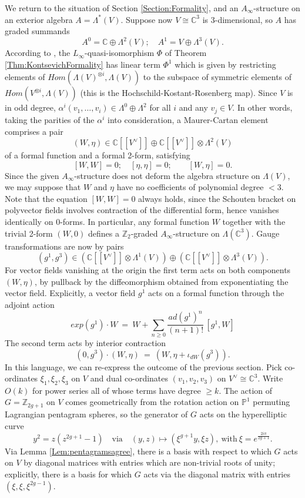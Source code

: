 \documentclass[reqno,10pt]{amsart}
\numberwithin{equation}{section}
\newcommand{\bC}{{\mathbb C}}
\newcommand{\bP}{{\mathbb P}}
\newcommand{\bZ}{{\mathbb Z}}
\theoremstyle{remark}
\begin{document}
We return to the situation of Section \ref{Section:Formality}, and an $A_{\infty}$-structure on an exterior algebra $A=\Lambda^*(V)$.  Suppose now $V \cong \bC^3$ is 3-dimensional, so $A$ has graded summands
\[
A^0 = \bC \oplus \Lambda^2(V); \quad A^1 = V \oplus \Lambda^3(V).
\]  
According to \cite[Theorem 3.3]{Seidel:HMSgenus2}, the $L_{\infty}$-quasi-isomorphism $\Phi$ of Theorem \ref{Thm:KontsevichFormality} has linear term $\Phi^1$ which is given by restricting elements of $Hom(\Lambda(V)^{\otimes i}, \Lambda(V))$ to the subspace of symmetric elements of $Hom(V^{\otimes i}, \Lambda(V))$ (this is the Hochschild-Kostant-Rosenberg map).  Since $V$ is in odd degree, $\alpha^i(v_1,\ldots, v_i) \in \Lambda^0 \oplus \Lambda^2$ for all $i$ and any $v_j\in V$.
In other words, taking the parities of the $\alpha^i$ into consideration, a Maurer-Cartan element comprises a pair
\[
(W, \eta) \in \bC[[V^{\vee}]] \oplus \bC[[V^{\vee}]]\otimes \Lambda^2(V)
\]
of a formal function and a formal 2-form, satisfying
\[
[W, W] = 0; \quad [\eta, \eta]=0; \qquad [W, \eta]=0.
\]  
Since the given $A_{\infty}$-structure does not deform the algebra structure on $\Lambda(V)$, we may suppose that $W$ and $\eta$ have no coefficients of polynomial degree $<3$.
Note that the equation $[W, W]=0$ always holds, since the Schouten bracket on polyvector fields involves contraction of the differential form, hence vanishes identically on $0$-forms.  In particular, any formal function $W$ together with the trivial 2-form $(W,0)$ defines a $\bZ_2$-graded $A_{\infty}$-structure on $\Lambda(\bC^3)$.  Gauge transformations are now by pairs
\[
(g^1,g^3) \in \left(\bC[[V^{\vee}]]\otimes \Lambda^1(V)\right) \oplus \left(\bC[[V^{\vee}]]\otimes \Lambda^3(V)\right).
\]
For vector fields vanishing at the origin the first term acts on both components $(W, \eta)$, by pullback by the diffeomorphism obtained from exponentiating the vector field.  Explicitly, a vector field $g^1$ acts on a formal function through the adjoint action
\begin{equation} \label{Eqn:ExpAdjoint}
exp(g^1)\cdot W \ = \ W + \sum_{n \geq 0} \frac{ad(g^1)^{n}}{(n+1)!} \, [g^1,W]
\end{equation}
 The second term acts by interior contraction
\begin{equation} \label{Eqn:gauge}
(0,g^3) \cdot (W, \eta) \ = \ (W, \eta + \iota_{dW}(g^3)).
\end{equation}
In this language, we can re-express the outcome of the previous section.  Pick co-ordinates $\xi_1, \xi_2, \xi_3$ on $V$ and dual co-ordinates $(v_1,v_2,v_3)$ on $V^{\vee}\cong \bC^3$.  Write $O(k)$ for power series all of whose terms have degree $\geq k$.   The action of $G=\bZ_{2g+1}$ on $V$ comes geometrically from the rotation action on $\bP^1$ permuting Lagrangian pentagram spheres, so the generator of $G$ acts on the hyperelliptic curve 
\[
y^2 = z(z^{2g+1}-1) \quad  \textrm{via} \quad (y,z) \mapsto (\xi^{g+1}y, \xi z), \ \textrm{with} \ \xi=e^{\frac{2i\pi}{2g+1}}.
\]
Via Lemma \ref{Lem:pentagramsagree}, there is a basis with respect to which $G$ acts on $V$  by diagonal matrices with entries which are non-trivial roots of unity; explicitly, there is a basis for which $G$ acts via the diagonal matrix with entries $(\xi,\xi,\xi^{2g-1})$.  
\end{document}
